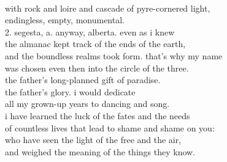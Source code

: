 \documentclass[smalldemyvopaper,11pt,twoside,onecolumn,openright,extrafontsizes]{memoir}
\begin{document}
\\with rock and loire and cascade of pyre-cornered light,
\\endingless, empty, monumental.
\\2.  segesta, a.  anyway, alberta.  even as i knew
\\the almanac kept track of the ends of the earth,
\\and the boundless realms took form. that's why my name
\\was chosen even then into the circle of the three.
\\the father's long-planned gift of paradise.
\\the father's glory.  i would dedicate
\\all my grown-up years to dancing and song.
\\i have learned the luck of the fates and the needs
\\of countless lives that lead to shame and shame on you:
\\who have seen the light of the free and the air,
\\and weighed the meaning of the things they know.
\end{document}
